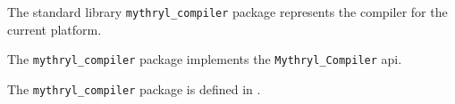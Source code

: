 
The standard library {\tt mythryl\_compiler} package represents the compiler for the current platform.

The {\tt mythryl\_compiler} package implements the {\tt Mythryl\_Compiler} api.

The {\tt mythryl\_compiler} package is defined in .
